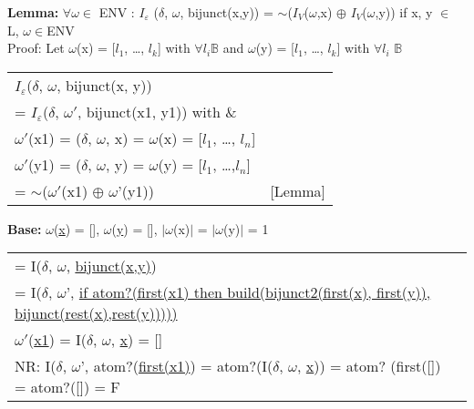 \documentclass[10pt, a4paper]{article}
\begin{document}
    \begin{description} 

    \item \textbf{Lemma:} $\forall \omega \in$ ENV : $I_{\varepsilon}$ ($\delta$, $\omega$, bijunct(x,y)) = 
    $\sim$($I_V$($\omega$,x) $\mathbin{\oplus}$ $I_V$($\omega$,y))  if x, y $\in$ L, $\omega \in $ENV \\
    Proof: Let $\omega$(x) = [$l_1$, \dots, $l_k$] with $\forall l_i  \mathbb{B}$ and  $\omega$(y) = 
    [$l_1$, \dots, $l_k$] with $\forall l_i$ $\mathbb{B}$ \\
        \begin{tabular}{ l l  } %
            $I_{\varepsilon}$($\delta$, $\omega$, bijunct(x, y)) &  \\
            = $I_{\varepsilon}$($\delta$, $\omega'$, bijunct(x1, y1))  with \&  \\
            \noindent\hspace*{8mm} $\omega'$(x1) = ($\delta$, $\omega$, x) = $\omega$(x) = 
            [$l_1$, \dots, $l_n$]  &  \\
            \noindent\hspace*{8mm} $\omega'$(y1) = ($\delta$, $\omega$, y) = $\omega$(y) = [$l_1$, 
            \dots,$l_n$] &  \\
            = $\sim$($\omega'$(x1) $\mathbin{\oplus}$ $\omega$'(y1))                & [Lemma] \\
        \end{tabular}
        
    \item \textbf{Base:} $\omega$(\underline{x}) = [], $\omega$(\underline{y}) = [], $\vert\omega$(x)$\vert$ = $\vert\omega$(y)$\vert$ = 1
    
        \begin{tabular}{ l l } 
            = I($\delta$, $\omega$, \underline{bijunct(x,y)})       &  \\
            = I($\delta$, $\omega$', \underline{if atom?(first(x1) then build(bijunct2(first(x), first(y)),
            bijunct(rest(x),rest(y)))))} & \\
            \noindent\hspace*{8mm} $\omega'$(\underline{x1}) = I($\delta$, $\omega$, \underline{x}) = [] & \\
            NR: I($\delta$, $\omega$', atom?(\underline{first(x1)}) = atom?(I($\delta$, $\omega$,
            \underline{x})) = atom?
            (first([]) = atom?([]) = F & \\
            

\end{tabular}
\end{description}
\end{document}
